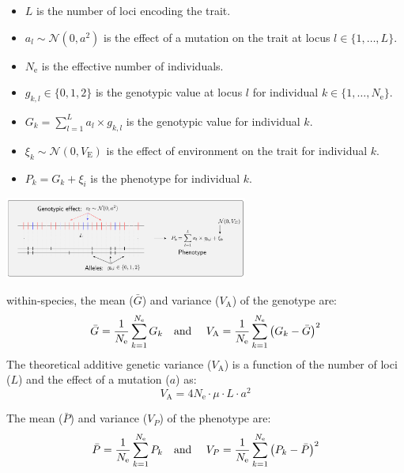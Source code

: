 \documentclass{article}
\newcommand{\Multiply}{\cdot}
\newcommand{\Ne}{N_{\text{e}}}
\newcommand{\Indiv}{k}
\newcommand{\Trait}{P}
\newcommand{\MutationRatePheno}{\mu}
\newcommand{\NbrLoci}{L}
\newcommand{\VarPhenotype}{V_{\Trait}}
\newcommand{\VarGenetic}{V_{\mathrm{A}}}
\newcommand{\VarEnv}{V_{\mathrm{E}}}
\begin{document}
\begin{itemize}
    \item $\NbrLoci$ is the number of loci encoding the trait.
    \item $a_l \sim \mathcal{N}(0,a^2)$ is the effect of a mutation on the trait at locus $l \in \{1, \hdots, \NbrLoci\}$.
    \item $\Ne$ is the effective number of individuals.
    \item $g_{\Indiv,l} \in \{0, 1, 2\}$ is the genotypic value at locus $l$ for individual $\Indiv \in \{1, \hdots, \Ne\}$.
    \item $G_{\Indiv} = \sum_{l=1}^{\NbrLoci} a_l \times g_{\Indiv,l}$ is the genotypic value for individual $\Indiv$.
    \item $\xi_{\Indiv} \sim \mathcal{N}(0, \VarEnv)$ is the effect of environment on the trait for individual $\Indiv$.
    \item $\Trait_{\Indiv} = G_{\Indiv}+ \xi_i$ is the phenotype for individual $\Indiv$.
\end{itemize}

\begin{center}
    \includegraphics[width=0.6\textwidth, page=1] {figureS1}
    \label{fig:simulator-summary}
\end{center}

within-species, the mean ($\bar{G}$) and variance ($\VarGenetic$) of the genotype are:
\begin{equation}
    \bar{G} = \frac{1}{\Ne}\sum_{\Indiv=1}^{\Ne} G_{\Indiv} \text{\quad and \quad} \VarGenetic = \frac{1}{\Ne}\sum_{\Indiv=1}^{\Ne}\left(G_{\Indiv}- \bar{G} \right)^2\label{eq:simu-genotype}
\end{equation}
The theoretical additive genetic variance ($\VarGenetic$) is a function of the number of loci ($\NbrLoci$) and the effect of a mutation ($a$) as:
\begin{equation}
    \VarGenetic = 4 \Ne \Multiply \MutationRatePheno \Multiply \NbrLoci \Multiply a^2 \label{eq:simu-var-genetic}
\end{equation}

The mean ($\bar{\Trait}$) and variance ($\VarPhenotype$) of the phenotype are:
\begin{equation}
    \bar{\Trait} = \frac{1}{\Ne}\sum_{\Indiv=1}^{\Ne} \Trait_{\Indiv}\text{\quad and \quad} \VarPhenotype = \frac{1}{\Ne}\sum_{\Indiv=1}^{\Ne}\left(\Trait_{\Indiv} - \bar{\Trait} \right)^2 \label{eq:simu-between}
\end{equation}
\end{document}
